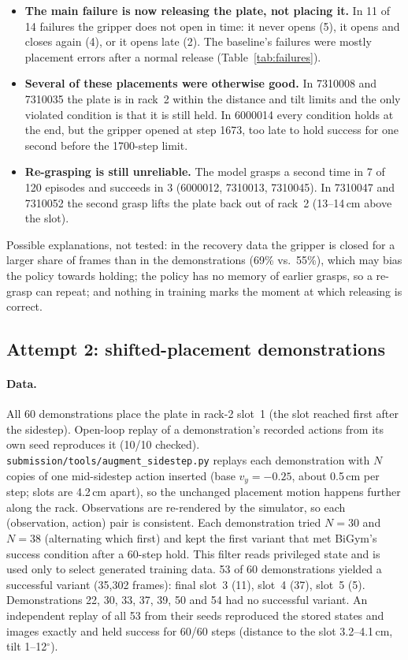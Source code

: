 \documentclass[11pt,a4paper]{article}
\begin{document}
\begin{itemize}
  \item \textbf{The main failure is now releasing the plate, not placing
        it.} In 11 of 14 failures the gripper does not open in time: it never
        opens (5), it opens and closes again (4), or it opens late (2). The
        baseline's failures were mostly placement errors after a normal
        release (Table~\ref{tab:failures}).
  \item \textbf{Several of these placements were otherwise good.} In
        7310008 and 7310035 the plate is in rack~2 within the distance and
        tilt limits and the only violated condition is that it is still held.
        In 6000014 every condition holds at the end, but the gripper opened
        at step 1673, too late to hold success for one second before the
        1700-step limit.
  \item \textbf{Re-grasping is still unreliable.} The model grasps a second
        time in 7 of 120 episodes and succeeds in 3 (6000012, 7310013,
        7310045). In 7310047 and 7310052 the second grasp lifts the plate
        back out of rack~2 (13--14\,cm above the slot).
\end{itemize}

Possible explanations, not tested: in the recovery data the gripper is
closed for a larger share of frames than in the demonstrations (69\% vs.\
55\%), which may bias the policy towards holding; the policy has no memory of earlier grasps, so a re-grasp can
repeat; and nothing in training marks the moment at which releasing is
correct.

\subsection{Attempt 2: shifted-placement demonstrations}
\label{sec:shift}

\paragraph{Data.} All 60 demonstrations place the plate in rack-2 slot~1
(the slot reached first after the sidestep). Open-loop replay of a
demonstration's recorded actions from its own seed reproduces it (10/10
checked). \texttt{submission/tools/augment\_sidestep.py} replays each
demonstration with $N$ copies of one mid-sidestep action inserted (base
$v_y=-0.25$, about 0.5\,cm per step; slots are 4.2\,cm apart), so the
unchanged placement motion happens further along the rack. Observations are
re-rendered by the simulator, so each (observation, action) pair is
consistent. Each demonstration tried $N=30$ and $N=38$ (alternating which
first) and kept the first variant that met BiGym's success condition after a
60-step hold. This filter reads privileged state and is used only to select
generated training data. 53 of 60 demonstrations yielded a successful
variant (35{,}302 frames): final slot~3 (11), slot~4 (37), slot~5 (5).
Demonstrations 22, 30, 33, 37, 39, 50 and 54 had no successful variant.
An independent replay of all 53 from their seeds reproduced the stored
states and images exactly and held success for 60/60 steps (distance to
the slot 3.2--4.1\,cm, tilt 1--12$^\circ$).
\end{document}
